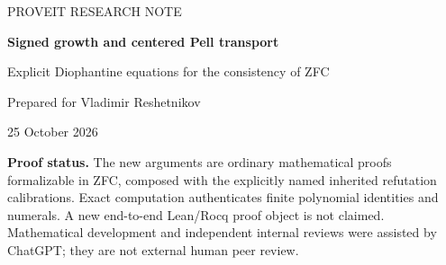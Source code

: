 \documentclass[11pt]{article}
\theoremstyle{remark}\newtheorem{remark}[theorem]{Remark}
\newcommand{\Con}{\operatorname{Con}}\newcommand{\ZFC}{\mathsf{ZFC}}
\begin{document}
\begin{titlepage}
\vspace*{1.2cm}
{\color{accent}\Large PROVEIT RESEARCH NOTE}\par
\vspace{0.6cm}
{\color{ink}\huge\bfseries Signed growth and centered Pell transport\par}
\vspace{0.35cm}
{\LARGE Explicit Diophantine equations for the consistency of ZFC\par}
\vspace{0.8cm}
{\large Prepared for Vladimir Reshetnikov}\par
{\large 25 October 2026}\par
\vspace{0.8cm}
\begin{abstract}
We give explicitly specified ordinary polynomials whose nonsolvability, in
their stated domains, is provably equivalent in ZFC to syntactic
\(\Con(\ZFC)\). A signed affine horizon, followed by a divisibility-justified
rescaling, yields a quartic in 209 unrestricted integers. A separate
construction combines a free quotient with an integer polynomial center
and a new transport bound to obtain degree 190 in ten positive integers.
Three compositions with oriented pooling give further unrestricted-integer
tradeoffs. Every equation is accompanied by its literal coefficient or
circuit data, constructive reductions, fixed-source provenance, and
reproducible exact checks. We also identify why a tempting additional
variable elimination fails: it limits the capacity of the proof-state
encoding. The results improve specified constructions and do not establish
a global minimum for Diophantine consistency equations.
\end{abstract}
\vfill
\begin{minipage}{\textwidth}
\small
\textbf{Proof status.} The new arguments are ordinary mathematical proofs
formalizable in ZFC, composed with the explicitly named inherited
refutation calibrations. Exact computation authenticates finite polynomial
identities and numerals. A new end-to-end Lean/Rocq proof object is not
claimed. Mathematical development and independent internal reviews were
assisted by ChatGPT; they are not external human peer review.
\end{minipage}
\end{titlepage}
\tableofcontents
\newpage







\appendix


\end{document}
